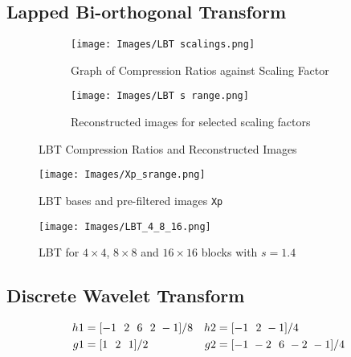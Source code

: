\subsection{Lapped Bi-orthogonal Transform}
\vspace{-2mm}
\begin{figure}[h]
\centering
\begin{subfigure}{.35\textwidth}
  \centering
  \texttt{[image: Images/LBT scalings.png]}
    \caption{Graph of Compression Ratios against Scaling Factor}
    \label{fig:LBT scaling}
\end{subfigure}%
\begin{subfigure}{.6\textwidth}
  \centering
  \texttt{[image: Images/LBT s range.png]}
  \caption{Reconstructed images for selected scaling factors}
  \label{fig:LBT s range}
\end{subfigure}
\caption{LBT Compression Ratios and Reconstructed Images}
\label{fig:LBT}
\end{figure}

\begin{figure}[h]
    \centering
    \texttt{[image: Images/Xp\_srange.png]}
    \caption{LBT bases and pre-filtered images \texttt{Xp}}
    \label{fig:LBT bases and Xp}
\end{figure}

\begin{figure}[h]
    \centering
    \texttt{[image: Images/LBT\_4\_8\_16.png]}
    \caption{LBT for $4 \times 4$, $8 \times 8$ and $16 \times 16$ blocks with $s = 1.4$}
    \label{fig:LBT 4 8 16}
\end{figure}

\subsection{Discrete Wavelet Transform}
\vspace{-2mm}
\begin{align}
\centering
    h1 & = [-1 {\ \ }2 {\ \ }6 {\ \ }2 {\ }-1]/8
    & h2 & = [-1 {\ \ }2 {\ }-1]/4 \label{eqn:DWT forward filters}\\
    g1 & = [1 {\ \ }2 {\ \ }1]/2
    & g2 & = [-1 {\ }-2 {\ \ }6 {\ }-2 {\ }-1]/4
    \label{eqn:DWT reverse filters}
\end{align}
\vspace{-2mm}


